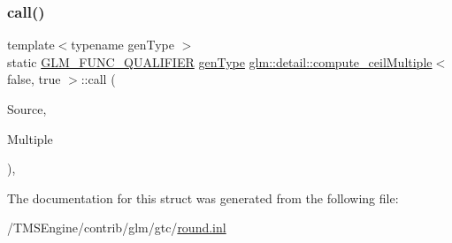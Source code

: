 \subsubsection{\texorpdfstring{call()}{call()}}
{\footnotesize\ttfamily template$<$typename gen\+Type $>$ \\
static \hyperlink{setup_8hpp_a33fdea6f91c5f834105f7415e2a64407}{G\+L\+M\+\_\+\+F\+U\+N\+C\+\_\+\+Q\+U\+A\+L\+I\+F\+I\+ER} \hyperlink{structglm_1_1detail_1_1gen_type}{gen\+Type} \hyperlink{structglm_1_1detail_1_1compute__ceil_multiple}{glm\+::detail\+::compute\+\_\+ceil\+Multiple}$<$ false, true $>$\+::call (\begin{DoxyParamCaption}\item[{\hyperlink{structglm_1_1detail_1_1gen_type}{gen\+Type}}]{Source,  }\item[{\hyperlink{structglm_1_1detail_1_1gen_type}{gen\+Type}}]{Multiple }\end{DoxyParamCaption})\hspace{0.3cm}{\ttfamily [inline]}, {\ttfamily [static]}}



The documentation for this struct was generated from the following file\+:\begin{DoxyCompactItemize}
\item 
/\+T\+M\+S\+Engine/contrib/glm/gtc/\hyperlink{round_8inl}{round.\+inl}\end{DoxyCompactItemize}
